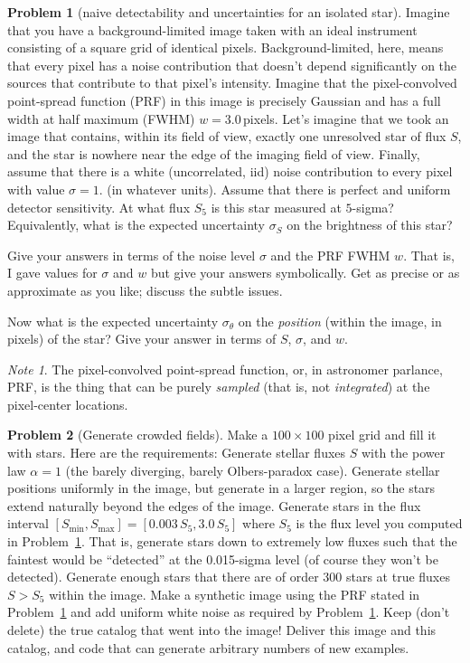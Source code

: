 \documentclass{article}
\theoremstyle{definition}
\newcommand{\problemname}{Problem}
\newtheorem{problem}{\problemname}
\newcommand{\probref}[1]{\problemname~\ref{#1}}
\theoremstyle{remark}
\newcommand{\notename}{Note}
\newtheorem{note}{\notename}[problem]
\begin{document}
\begin{problem}[naive detectability and uncertainties for an isolated star]\label{prob:naive}
Imagine that you have a background-limited image taken with an ideal instrument consisting of a square grid of identical pixels.
Background-limited, here, means that every pixel has a noise contribution that doesn't depend significantly on the sources that contribute to that pixel's intensity.
Imagine that the pixel-convolved point-spread function (PRF) in this image is precisely Gaussian and has a full width at half maximum (FWHM) $w=3.0$\,pixels.
Let's imagine that we took an image that contains, within its field of view, exactly one unresolved star of flux $S$, and the star is nowhere near the edge of the imaging field of view.
Finally, assume that there is a white (uncorrelated, iid) noise contribution to every pixel with value $\sigma=1.$ (in whatever units).
Assume that there is perfect and uniform detector sensitivity.
At what flux $S_5$ is this star measured at $5$-sigma?
Equivalently, what is the expected uncertainty $\sigma_S$ on the brightness of this star?

Give your answers in terms of the noise level $\sigma$ and the PRF FWHM $w$.
That is, I gave values for $\sigma$ and $w$ but give your answers symbolically.
Get as precise or as approximate as you like; discuss the subtle issues.

Now what is the expected uncertainty $\sigma_\theta$ on the \emph{position} (within the image, in pixels) of the star?
Give your answer in terms of $S$, $\sigma$, and $w$.
\end{problem}

\begin{note}
The pixel-convolved point-spread function, or, in astronomer parlance, PRF, is the thing that can be purely \emph{sampled} (that is, not \emph{integrated}) at the pixel-center locations.
\end{note}

\begin{problem}[Generate crowded fields]\label{prob:simulate}
Make a $100\times 100$ pixel grid and fill it with stars.
Here are the requirements:
Generate stellar fluxes $S$ with the power law $\alpha=1$ (the barely diverging, barely Olbers-paradox case).
Generate stellar positions uniformly in the image, but generate in a larger region, so the stars extend naturally beyond the edges of the image.
Generate stars in the flux interval $[S_{\min},S_{\max}]=[0.003\,S_5, 3.0\,S_5]$ where $S_5$ is the flux level you computed in \probref{prob:naive}.
That is, generate stars down to extremely low fluxes such that the faintest would be ``detected'' at the 0.015-sigma level (of course they won't be detected).
Generate enough stars that there are of order 300 stars at true fluxes $S>S_5$ within the image.
Make a synthetic image using the PRF stated in \probref{prob:naive} and add uniform white noise as required by \probref{prob:naive}.
Keep (don't delete) the true catalog that went into the image!
Deliver this image and this catalog, and code that can generate arbitrary numbers of new examples.
\end{problem}
\end{document}
